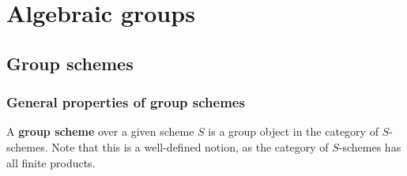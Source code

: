 \section{Algebraic groups}
    \subsection{Group schemes}
        \subsubsection{General properties of group schemes}
            \begin{definition} \label{def: group_schemes}
                A \textbf{group scheme} over a given scheme $S$ is a group object in the category of $S$-schemes. Note that this is a well-defined notion, as the category of $S$-schemes has all finite products.
                

\end{definition}

